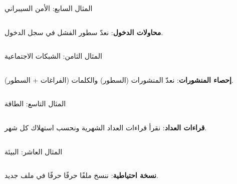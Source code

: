 \documentclass[aspectratio=169, 11pt, t, xcolor={table}]{beamer}
\begin{document}
\begin{frame}[t]{المثال السابع: الأمن السيبراني}
    \begin{columns}[T]
        {\small \textbf{محاولات الدخول}: نعدّ سطور الفشل  في سجل الدخول.\par}
        \vspace{0.3cm}
    \end{columns}
\end{frame}

\begin{frame}[t]{المثال الثامن: الشبكات الاجتماعية}
    \begin{columns}[T]
        {\small \textbf{إحصاء المنشورات}: نعدّ المنشورات (السطور) والكلمات (الفراغات + السطور).\par}
        \vspace{0.3cm}
    \end{columns}
\end{frame}

\begin{frame}[t]{المثال التاسع: الطاقة}
    \begin{columns}[T]
        {\small \textbf{قراءات العداد}: نقرأ قراءات العداد الشهرية ونحسب استهلاك كل شهر.\par}
        \vspace{0.3cm}
    \end{columns}
\end{frame}

\begin{frame}[t]{المثال العاشر: البيئة}
    \begin{columns}[T]
        {\small \textbf{نسخة احتياطية}: ننسخ ملفًا حرفًا حرفًا في ملف جديد.\par}
        \vspace{0.3cm}
    \end{columns}
\end{frame}
\end{document}

